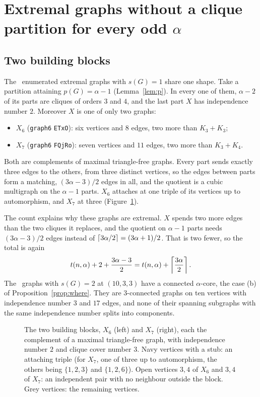 \section{Extremal graphs without a clique partition for every odd \texorpdfstring{$\alpha$}{alpha}}\label{sec:construction}

\subsection{Two building blocks}

The \nsone\ enumerated extremal graphs with $s(G)=1$ share one shape. Take a partition attaining $p(G)=\alpha-1$
(Lemma~\ref{lem:p}). In every one of them, $\alpha-2$ of its parts are cliques of orders $3$ and $4$, and the last part
$X$ has independence number $2$. Moreover $X$ is one of only two graphs:
\begin{itemize}
\item $X_6$ (\texttt{graph6} \texttt{ETxO}): six vertices and $8$ edges, two more than $K_3+K_3$;
\item $X_7$ (\texttt{graph6} \texttt{FQjRo}): seven vertices and $11$ edges, two more than $K_3+K_4$.
\end{itemize}
Both are complements of maximal triangle-free graphs. Every part sends exactly three edges to the others, from three
distinct vertices, so the edges between parts form a matching, $(3\alpha-3)/2$ edges in all, and the quotient is a
cubic multigraph on the $\alpha-1$ parts. $X_6$ attaches at one triple of its vertices up to automorphism, and $X_7$ at
three (Figure~\ref{fig:blocks}).

The count explains why these graphs are extremal. $X$ spends two more edges than the two cliques it replaces, and the
quotient on $\alpha-1$ parts needs $(3\alpha-3)/2$ edges instead of $\left\lceil 3\alpha/2\right\rceil=(3\alpha+1)/2$. That is two fewer,
so the total is again
\begin{equation}\label{eq:count}
t(n,\alpha)+2+\frac{3\alpha-3}{2}=t(n,\alpha)+\left\lceil \frac{3\alpha}{2}\right\rceil.
\end{equation}
The \ntenthreeb\ graphs with $s(G)=2$ at $(10,3,3)$ have a connected $\alpha$-core, the case (b) of
Proposition~\ref{prop:where}. They are $3$-connected graphs on ten vertices with independence number $3$ and $17$
edges, and none of their spanning subgraphs with the same independence number splits into components.

\begin{figure}[t]
\centering

\caption{The two building blocks, $X_6$ (left) and $X_7$ (right), each the complement of a maximal triangle-free graph,
with independence number $2$ and clique cover number $3$. Navy vertices with a stub: an attaching triple (for
$X_7$, one of three up to automorphism, the others being $\{1,2,3\}$ and $\{1,2,6\}$). Open vertices $3,4$ of $X_6$ and
$3,4$ of $X_7$: an independent pair with no neighbour outside the block. Grey vertices: the remaining vertices.}
\label{fig:blocks}
\end{figure}

